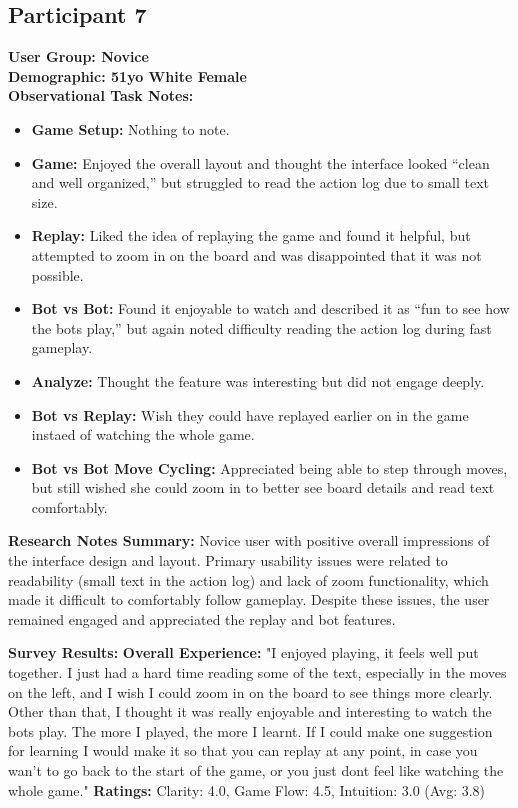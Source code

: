 \documentclass[12pt]{article}
\begin{document}
\subsection{Participant 7}
\textbf {User Group: Novice} \\
\textbf {Demographic: 51yo White Female} \\
\textbf{Observational Task Notes:}
\begin{itemize}
    \item \textbf{Game Setup:} Nothing to note.
    \item \textbf{Game:} Enjoyed the overall layout and thought the interface looked “clean and well organized,” but struggled to read the action log due to small text size. 
    \item \textbf{Replay:} Liked the idea of replaying the game and found it helpful, but attempted to zoom in on the board and was disappointed that it was not possible.
    \item \textbf{Bot vs Bot:} Found it enjoyable to watch and described it as “fun to see how the bots play,” but again noted difficulty reading the action log during fast gameplay.
    \item \textbf{Analyze:} Thought the feature was interesting but did not engage deeply.
    \item \textbf{Bot vs Replay:} Wish they could have replayed earlier on in the game instaed of watching the whole game.
    \item \textbf{Bot vs Bot Move Cycling:} Appreciated being able to step through moves, but still wished she could zoom in to better see board details and read text comfortably.
\end{itemize}

\textbf{Research Notes Summary:} Novice user with positive overall impressions of the interface design and layout. Primary usability issues were related to readability (small text in the action log) and lack of zoom functionality, which made it difficult to comfortably follow gameplay. Despite these issues, the user remained engaged and appreciated the replay and bot features.

\textbf{Survey Results:} 
\subitem \textbf{Overall Experience:} "I enjoyed playing, it feels well put together. I just had a hard time reading some of the text, especially in the moves on the left, and I wish I could zoom in on the board to see things more clearly. Other than that, I thought it was really enjoyable and interesting to watch the bots play. The more I played, the more I learnt. If I could make one suggestion for learning I would make it so that you can replay at any point, in case you wan't to go back to the start of the game, or you just dont feel like watching the whole game."
\subitem \textbf{Ratings:} Clarity: 4.0, Game Flow: 4.5, Intuition: 3.0 (Avg: 3.8)
\end{document}
